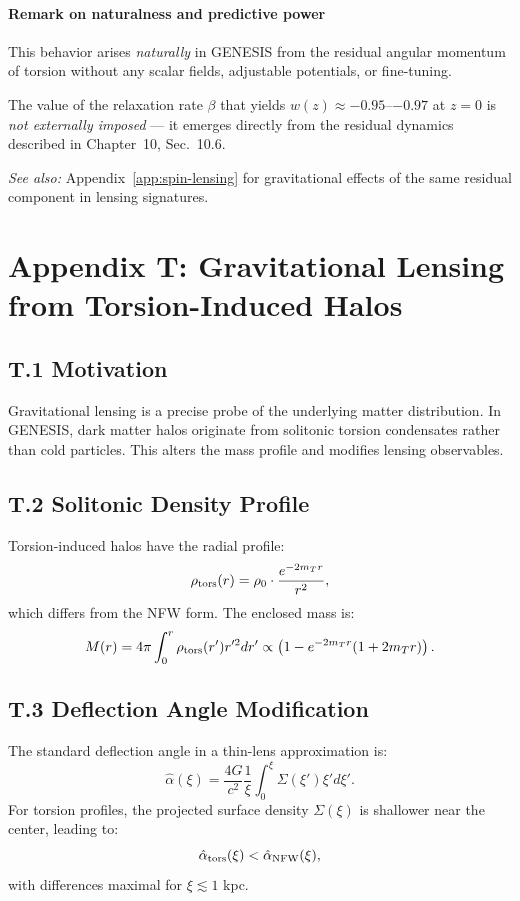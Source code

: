 \documentclass{article}
\begin{document}
\paragraph{Remark on naturalness and predictive power}

This behavior arises \emph{naturally} in GENESIS from the residual angular momentum 
of torsion without any scalar fields, adjustable potentials, or fine-tuning.

The value of the relaxation rate $\beta$ that yields $w(z) \approx -0.95$–$-0.97$ 
at $z = 0$ is \emph{not externally imposed} — it emerges directly from the 
residual dynamics described in Chapter~10, Sec.~10.6.

\vspace{0.5em}
\noindent\textit{See also:} Appendix~\ref{app:spin-lensing} for gravitational effects 
of the same residual component in lensing signatures.


\section*{Appendix T: Gravitational Lensing from Torsion-Induced Halos}
\label{app:spin-lensing}

\subsection*{T.1 Motivation}
Gravitational lensing is a precise probe of the underlying matter distribution.  
In GENESIS, dark matter halos originate from solitonic torsion condensates rather than cold particles.  
This alters the mass profile and modifies lensing observables.

\subsection*{T.2 Solitonic Density Profile}
Torsion-induced halos have the radial profile:
\[
\rho_{\rm tors}(r) = \rho_0 \cdot \frac{e^{-2 m_T r}}{r^2},
\]
which differs from the NFW form. The enclosed mass is:
\[
M(r) = 4\pi \int_0^r \rho_{\rm tors}(r') r'^2 dr' \propto \left(1 - e^{-2 m_T r}(1 + 2 m_T r)\right).
\]

\subsection*{T.3 Deflection Angle Modification}
The standard deflection angle in a thin-lens approximation is:
\[
\hat{\alpha}(\xi) = \frac{4G}{c^2} \frac{1}{\xi} \int_0^\xi \Sigma(\xi') \xi' d\xi'.
\]
For torsion profiles, the projected surface density $\Sigma(\xi)$ is shallower near the center, leading to:
\[
\hat{\alpha}_{\rm tors}(\xi) < \hat{\alpha}_{\rm NFW}(\xi),
\]
with differences maximal for $\xi \lesssim 1$ kpc.
\end{document}
